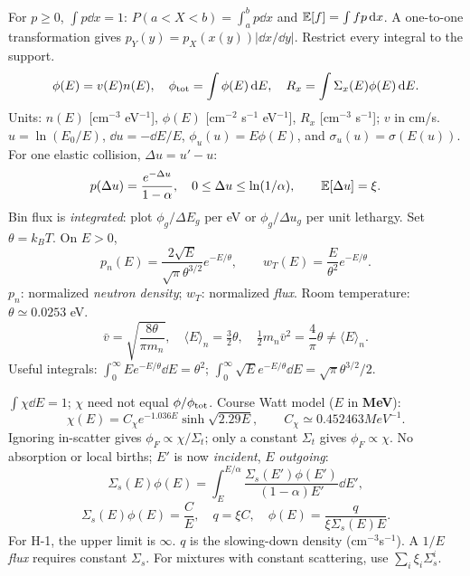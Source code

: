 \newpage
\begin{handoutcolumns}
For $p\ge0$, $\int p\dd x=1$:
$P(a<X<b)=\int_a^bp\dd x$ and $\mathbb E[f]=\int fp\,\mathrm d x$.
A one-to-one transformation gives $p_Y(y)=p_X(x(y))|\dd x/\dd y|$.
Restrict every integral to the support.
\[
 \phi(E)=v(E)n(E),\quad \phi_{\rm tot}=\int\phi(E)\,\mathrm d E,
 \quad R_x=\int\Sigma_x(E)\phi(E)\,\mathrm d E.
\]
Units: $n(E)$ [cm$^{-3}$ eV$^{-1}$], $\phi(E)$ [cm$^{-2}$ s$^{-1}$ eV$^{-1}$],
$R_x$ [cm$^{-3}$ s$^{-1}$]; $v$ in cm/s.
 $u=\ln(E_0/E)$, $\dd u=-\dd E/E$,
$\phi_u(u)=E\phi(E)$, and $\sigma_u(u)=\sigma(E(u))$.
For one elastic collision, $\Delta u=u'-u$:
\[
 p(\Delta u)=\frac{e^{-\Delta u}}{1-\alpha},
 \quad 0\le\Delta u\le\ln(1/\alpha),\qquad\mathbb E[\Delta u]=\xi.
\]
Bin flux is \emph{integrated}: plot $\phi_g/\Delta E_g$ per eV or
$\phi_g/\Delta u_g$ per unit lethargy.
 Set $\theta=k_BT$. On $E>0$,
\[
 p_n(E)=\frac{2\sqrt E}{\sqrt\pi\theta^{3/2}}e^{-E/\theta},
 \qquad w_T(E)=\frac{E}{\theta^2}e^{-E/\theta}.
\]
$p_n$: normalized \emph{neutron density}; $w_T$: normalized \emph{flux}.
Room temperature: $\theta\simeq0.0253$ eV.
\[
 \bar v=\sqrt{\frac{8\theta}{\pi m_n}},\quad
 \langle E\rangle_n=\tfrac32\theta,\quad
 \tfrac12m_n\bar v^2=\frac4\pi\theta\ne\langle E\rangle_n.
\]
Useful integrals: $\int_0^\infty Ee^{-E/\theta}\dd E=\theta^2$;
$\int_0^\infty\sqrt E e^{-E/\theta}\dd E=\sqrt\pi\theta^{3/2}/2$.

 $\int\chi\dd E=1$; $\chi$ need not equal
$\phi/\phi_{\rm tot}$. Course Watt model ($E$ in \textbf{MeV}):
\[
 \chi(E)=C_\chi e^{-1.036E}\sinh\sqrt{2.29E},\qquad
 C_\chi\simeq0.452463\unit{MeV^{-1}}.
\]
Ignoring in-scatter gives $\phi_F\propto\chi/\Sigma_t$;
only a constant $\Sigma_t$ gives $\phi_F\propto\chi$.
 No absorption or local births;
$E'$ is now \emph{incident}, $E$ \emph{outgoing}:
\[
 \Sigma_s(E)\phi(E)=\int_E^{E/\alpha}
 \frac{\Sigma_s(E')\phi(E')}{(1-\alpha)E'}\dd E',
\]
\[
 \Sigma_s(E)\phi(E)=\frac{C}{E},\quad q=\xi C,
 \quad \phi(E)=\frac{q}{\xi\Sigma_s(E)E}.
\]
For H-1, the upper limit is $\infty$. $q$ is the slowing-down density
(cm$^{-3}$s$^{-1}$). A $1/E$ \emph{flux} requires constant $\Sigma_s$.
For mixtures with constant scattering, use $\sum_i\xi_i\Sigma_s^i$.

\vspace{0.25cm}


\end{handoutcolumns}
